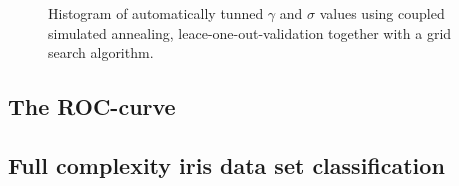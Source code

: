 \begin{figure}
\centering


\caption{Histogram of automatically tunned  $\gamma$ and $\sigma$ values using coupled simulated annealing, leace-one-out-validation together with a grid search algorithm.}
\label{fig:tuneCsaGridLeave}
\end{figure}

\subsection{The ROC-curve}

\begin{figure}
\centering

\caption{}
\label{fig:roc}
\end{figure}


\subsection{Full complexity iris data set classification}